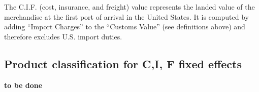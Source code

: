 \documentclass[a4paper,11pt]{article}
\begin{document}
The C.I.F. (cost, insurance, and freight) value represents the landed value of the merchandise at the first port of arrival in the United States. It is computed by adding ``Import Charges'' to the ``Customs Value'' (see definitions above) and therefore excludes U.S. import duties.

\subsection{Product classification for C,I, F fixed effects}
\textbf{to be done}
\end{document}
